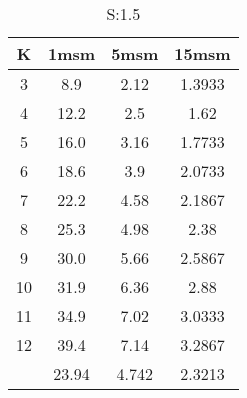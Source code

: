 \begin{table}[H]
\centering
\begin{tabular}{c|ccc}
K &1msm &5msm &15msm\\
\hline
3 & 8.9 & 2.12 & 1.3933\\
4 & 12.2 & 2.5 & 1.62\\
5 & 16.0 & 3.16 & 1.7733\\
6 & 18.6 & 3.9 & 2.0733\\
7 & 22.2 & 4.58 & 2.1867\\
8 & 25.3 & 4.98 & 2.38\\
9 & 30.0 & 5.66 & 2.5867\\
10 & 31.9 & 6.36 & 2.88\\
11 & 34.9 & 7.02 & 3.0333\\
12 & 39.4 & 7.14 & 3.2867\\
\hline
& 23.94 & 4.742 & 2.3213\\
\end{tabular}
\caption{S:1.5}
\label{tab:s1.5}
\end{table}

